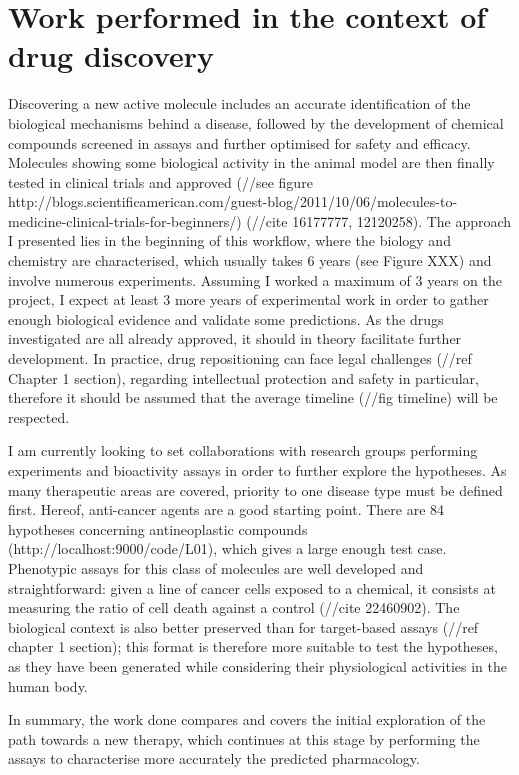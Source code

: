 \section{Work performed in the context of drug discovery}
Discovering a new active molecule includes an accurate identification of the biological mechanisms behind a disease, followed by the development of chemical compounds screened in assays and further optimised for safety and efficacy. Molecules showing some biological activity in the animal model are then finally tested in clinical trials and approved (//see figure http://blogs.scientificamerican.com/guest-blog/2011/10/06/molecules-to-medicine-clinical-trials-for-beginners/) (//cite 16177777, 12120258). The approach I presented lies in the beginning of this workflow, where the biology and chemistry are characterised, which usually takes 6 years (see Figure XXX) and involve numerous experiments. Assuming I worked a maximum of 3 years on the project, I expect at least 3 more years of experimental work in order to gather enough biological evidence and validate some predictions. As the drugs investigated are all already approved, it should in theory facilitate further development. In practice, drug repositioning can face legal challenges (//ref Chapter 1 section), regarding intellectual protection and safety in particular, therefore it should be assumed that the average timeline (//fig timeline) will be respected.

I am currently looking to set collaborations with research groups performing experiments and bioactivity assays in order to further explore the hypotheses. As many therapeutic areas are covered, priority to one disease type must be defined first. Hereof, anti-cancer agents are a good starting point. There are 84 hypotheses concerning antineoplastic compounds (http://localhost:9000/code/L01), which gives a large enough test case. Phenotypic assays for this class of molecules are well developed and straightforward: given a line of cancer cells exposed to a chemical, it consists at measuring the ratio of cell death against a control (//cite 22460902). The biological context is also better preserved than for target-based assays (//ref chapter 1 section); this format is therefore more suitable to test the hypotheses, as they have been generated while considering their physiological activities in the human body.

In summary, the work done compares and covers the initial exploration of the path towards a new therapy, which continues at this stage by performing the assays to characterise more accurately the predicted pharmacology.

